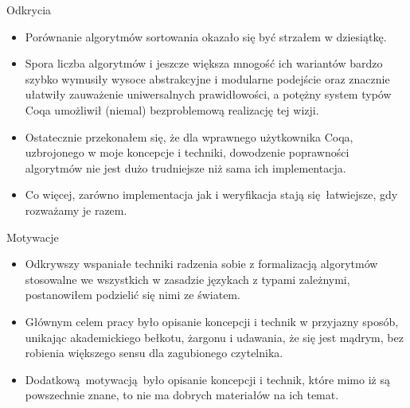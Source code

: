 \documentclass{beamer}
\begin{document}
\begin{frame}{Odkrycia}
\begin{itemize}
	\item Porównanie algorytmów sortowania okazało się być strzałem w dziesiątkę.
	\item Spora liczba algorytmów i jeszcze większa mnogość ich wariantów bardzo szybko wymusiły wysoce abstrakcyjne i modularne podejście oraz znacznie ułatwiły zauważenie uniwersalnych prawidłowości, a potężny system typów Coqa umożliwił (niemal) bezproblemową realizację tej wizji.
	\item Ostatecznie przekonałem się, że dla wprawnego użytkownika Coqa, uzbrojonego w moje koncepcje i techniki, dowodzenie poprawności algorytmów nie jest dużo trudniejsze niż sama ich implementacja.
	\item Co więcej, zarówno implementacja jak i weryfikacja stają się łatwiejsze, gdy rozważamy je razem.
\end{itemize}
\end{frame}

\begin{frame}{Motywacje}
\begin{itemize}
	\item Odkrywszy wspaniałe techniki radzenia sobie z formalizacją algorytmów stosowalne we wszystkich w zasadzie językach z typami zależnymi, postanowiłem podzielić się nimi ze światem.
	\item Głównym celem pracy było opisanie koncepcji i technik w przyjazny sposób, unikając akademickiego bełkotu, żargonu i udawania, że się jest mądrym, bez robienia większego sensu dla zagubionego czytelnika.
	\item Dodatkową motywacją było opisanie koncepcji i technik, które mimo iż są powszechnie znane, to nie ma dobrych materiałów na ich temat.
\end{itemize}
\end{frame}
\end{document}
